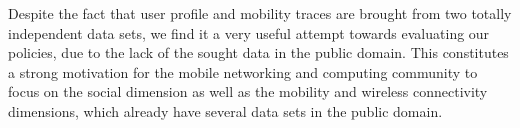 \documentclass[conference]{IEEEtran}
\theoremstyle{definition}
\begin{document}
Despite the fact that user profile and mobility traces are brought from two totally independent data sets, we find it a very useful attempt towards evaluating our policies, due to the lack of the sought data in the public domain. This constitutes a strong motivation for the mobile networking and computing community to focus on the social dimension as well as the mobility and wireless connectivity dimensions, which already have several data sets in the public domain.
%
%
%
\end{document}
